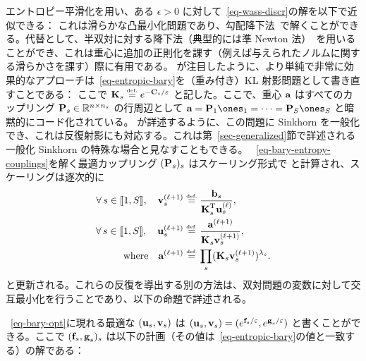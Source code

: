 エントロピー平滑化を用い、ある $\epsilon>0$ に対して~\eqref{eq-wass-discr}の解を以下で近似できる：
これは滑らかな凸最小化問題であり、勾配降下法~\citep{CuturiBarycenter,GramfortPC15}で解くことができる。代替として、半双対に対する降下法（典型的には準 Newton 法）~\citep{2016-Cuturi-siims}を用いることができ、これは重心に追加の正則化を課す（例えば与えられたノルムに関する滑らかさを課す）際に有用である。
\citet{2015-benamou-cisc}が注目したように、より単純で非常に効果的なアプローチは~\eqref{eq-entropic-bary}を（重み付き）KL 射影問題として書き直すことである：
ここで $\K_s \eqdef e^{-\C_s/\epsilon}$ と記した。ここで、重心 $\a$ はすべてのカップリング $\P_s \in \RR^{n \times n_s}$ の行周辺として $\a = \P_1\ones_1 =  \cdots = \P_S\ones_S$ と暗黙的にコード化されている。
\citet{2015-benamou-cisc}が詳述するように、この問題に Sinkhorn を一般化でき、これは反復射影にも対応する。これは第~\ref{sec-generalized}節で詳述される一般化 Sinkhorn の特殊な場合と見なすこともできる。
~\eqref{eq-bary-entropy-couplings}を解く最適カップリング $(\P_s)_s$ はスケーリング形式で
と計算され、スケーリングは逐次的に
\begin{align}\label{eq-sinkhorn-bary}
	\foralls s \in \range{1,S}, \quad \itt{\vD}_s &\eqdef \frac{\b_s}{\transp{\K}_s \it{\uD}_s}, \\
	\foralls s \in \range{1,S}, \quad  \itt{\uD}_s &\eqdef \frac{\itt{\a}}{\K_s \itt{\vD}_s}, \label{eq-sinkhorn-bary-2}\\
		\qwhereq
		\itt{\a} &\eqdef \prod_s (  \K_s \itt{\vD}_s )^{\la_s}. \label{eq-sinkhorn-bary-3}
\end{align}
と更新される。これらの反復を導出する別の方法は、双対問題の変数に対して交互最小化を行うことであり、以下の命題で詳述される。

\begin{prop}
	~\eqref{eq-bary-opt}に現れる最適な $(\uD_s,\vD_s)$ は $(\uD_s,\vD_s) = ( e^{\fD_s/\epsilon},e^{\gD_s/\epsilon} )$ と書くことができる。ここで $( \fD_s,\gD_s )_s$ は以下の計画（その値は~\eqref{eq-entropic-bary}の値と一致する）の解である：
\end{prop}

